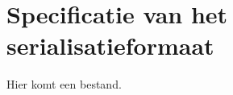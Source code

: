 \chapter{Specificatie van het serialisatieformaat}\label{ch:specificatie-van-het-serialisatieformaat}

Hier komt een bestand.

